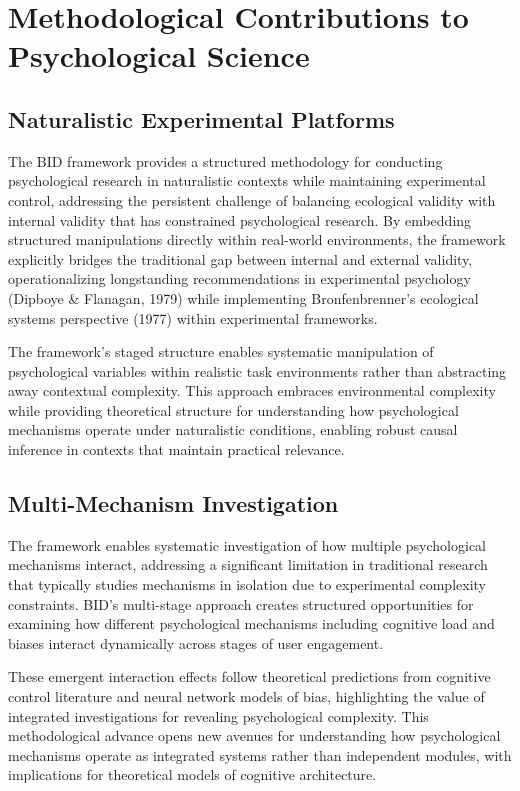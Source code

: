 \documentclass[
  authoryear,
  preprint]{elsarticle}
\begin{document}
\section{Methodological Contributions to Psychological
Science}\label{methodological-contributions-to-psychological-science}

\subsection{Naturalistic Experimental
Platforms}\label{naturalistic-experimental-platforms}

The BID framework provides a structured methodology for conducting
psychological research in naturalistic contexts while maintaining
experimental control, addressing the persistent challenge of balancing
ecological validity with internal validity that has constrained
psychological research. By embedding structured manipulations directly
within real-world environments, the framework explicitly bridges the
traditional gap between internal and external validity, operationalizing
longstanding recommendations in experimental psychology (Dipboye \&
Flanagan, 1979) while implementing Bronfenbrenner's ecological systems
perspective (1977) within experimental frameworks.

The framework's staged structure enables systematic manipulation of
psychological variables within realistic task environments rather than
abstracting away contextual complexity. This approach embraces
environmental complexity while providing theoretical structure for
understanding how psychological mechanisms operate under naturalistic
conditions, enabling robust causal inference in contexts that maintain
practical relevance.

\subsection{Multi-Mechanism
Investigation}\label{multi-mechanism-investigation}

The framework enables systematic investigation of how multiple
psychological mechanisms interact, addressing a significant limitation
in traditional research that typically studies mechanisms in isolation
due to experimental complexity constraints. BID's multi-stage approach
creates structured opportunities for examining how different
psychological mechanisms including cognitive load and biases interact
dynamically across stages of user engagement.

These emergent interaction effects follow theoretical predictions from
cognitive control literature and neural network models of bias,
highlighting the value of integrated investigations for revealing
psychological complexity. This methodological advance opens new avenues
for understanding how psychological mechanisms operate as integrated
systems rather than independent modules, with implications for
theoretical models of cognitive architecture.
\end{document}
